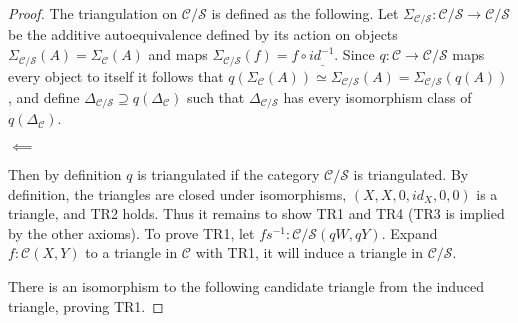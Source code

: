     \begin{proof}
        The triangulation on $\mathcal{C}/\mathcal{S}$ is defined as the following. Let $\Sigma_{\mathcal{C/S}}:\mathcal{C}/\mathcal{S}\rightarrow\mathcal{C}/\mathcal{S}$ be the additive autoequivalence defined by its action on objects $\Sigma_{\mathcal{C/S}}(A)=\Sigma_{\mathcal{C}}(A)$ and maps $\Sigma_{\mathcal{C/S}}(f) = f\circ id_{\_}^{-1}$. Since $q:\mathcal{C}\rightarrow\mathcal{C}/\mathcal{S}$ maps every object to itself it follows that $q(\Sigma_{\mathcal{C}}(A)) \simeq \Sigma_{\mathcal{C/S}}(A) = \Sigma_{\mathcal{C/S}}(q(A))$, and define $\Delta_{\mathcal{C}/\mathcal{S}}\supseteq q(\Delta_\mathcal{C})$ such that $\Delta_{\mathcal{C}/\mathcal{S}}$ has every isomorphism class of $q(\Delta_\mathcal{C})$. 
        \begin{center}
            $\impliedby$
        \end{center}
        Then by definition $q$ is triangulated if the category $\mathcal{C}/\mathcal{S}$ is triangulated.
        By definition, the triangles are closed under isomorphisms, $(X,X,0,id_X,0,0)$ is a triangle, and TR2 holds. Thus it remains to show TR1 and TR4 (TR3 is implied by the other axioms). To prove TR1, let $fs^{-1}:\mathcal{C}/\mathcal{S}(qW,qY)$. Expand $f:\mathcal{C}(X,Y)$ to a triangle in $\mathcal{C}$ with TR1, it will induce a triangle in  $\mathcal{C}/\mathcal{S}$.
        \begin{center}
        \end{center}
        There is an isomorphism to the following candidate triangle from the induced triangle, proving TR1.

\end{proof}
